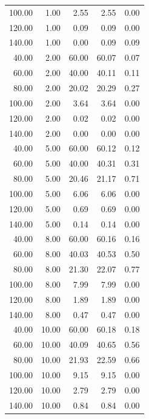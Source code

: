 \begin{longtable}{@{}rrrrr@{}}
100.00 & 1.00  & 2.55  & 2.55  & 0.00 \\
120.00 & 1.00  & 0.09  & 0.09  & 0.00 \\
140.00 & 1.00  & 0.00  & 0.09  & 0.09 \\
40.00  & 2.00  & 60.00 & 60.07 & 0.07 \\
60.00  & 2.00  & 40.00 & 40.11 & 0.11 \\
80.00  & 2.00  & 20.02 & 20.29 & 0.27 \\
100.00 & 2.00  & 3.64  & 3.64  & 0.00 \\
120.00 & 2.00  & 0.02  & 0.02  & 0.00 \\
140.00 & 2.00  & 0.00  & 0.00  & 0.00 \\
40.00  & 5.00  & 60.00 & 60.12 & 0.12 \\
60.00  & 5.00  & 40.00 & 40.31 & 0.31 \\
80.00  & 5.00  & 20.46 & 21.17 & 0.71 \\
100.00 & 5.00  & 6.06  & 6.06  & 0.00 \\
120.00 & 5.00  & 0.69  & 0.69  & 0.00 \\
140.00 & 5.00  & 0.14  & 0.14  & 0.00 \\
40.00  & 8.00  & 60.00 & 60.16 & 0.16 \\
60.00  & 8.00  & 40.03 & 40.53 & 0.50 \\
80.00  & 8.00  & 21.30 & 22.07 & 0.77 \\
100.00 & 8.00  & 7.99  & 7.99  & 0.00 \\
120.00 & 8.00  & 1.89  & 1.89  & 0.00 \\
140.00 & 8.00  & 0.47  & 0.47  & 0.00 \\
40.00  & 10.00 & 60.00 & 60.18 & 0.18 \\
60.00  & 10.00 & 40.09 & 40.65 & 0.56 \\
80.00  & 10.00 & 21.93 & 22.59 & 0.66 \\
100.00 & 10.00 & 9.15  & 9.15  & 0.00 \\
120.00 & 10.00 & 2.79  & 2.79  & 0.00 \\
140.00 & 10.00 & 0.84  & 0.84  & 0.00 \\
\end{longtable}
\endgroup

